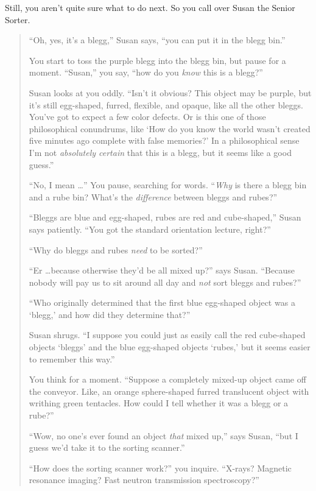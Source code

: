 {
 Still, you aren't quite sure what to do next. So
you call over Susan the Senior Sorter.}

\begin{quotation}
{
 ``Oh, yes, it's a
blegg,'' Susan says, ``you can put
it in the blegg bin.''}

{
 You start to toss the purple blegg into the blegg bin, but pause
for a moment. ``Susan,'' you say,
``how do you \textit{know} this is a
blegg?''}

{
 Susan looks at you oddly. ``Isn't
it obvious? This object may be purple, but it's still
egg-shaped, furred, flexible, and opaque, like all the other bleggs.
You've got to expect a few color defects. Or is this
one of those philosophical conundrums, like `How do you
know the world wasn't created five minutes ago complete
with false memories?' In a philosophical sense
I'm not \textit{absolutely certain} that this is a
blegg, but it seems like a good guess.''}

{
 ``No, I mean \ldots'' You pause,
searching for words. ``\textit{Why} is there a blegg
bin and a rube bin? What's the \textit{difference}
between bleggs and rubes?''}

{
 ``Bleggs are blue and egg-shaped, rubes are red
and cube-shaped,'' Susan says patiently.
``You got the standard orientation lecture,
right?''}

{
 ``Why do bleggs and rubes \textit{need} to be
sorted?''}

{
 ``Er \ldots because otherwise
they'd be all mixed up?'' says Susan.
``Because nobody will pay us to sit around all day and
\textit{not} sort bleggs and rubes?''}

{
 ``Who originally determined that the first blue
egg-shaped object was a `blegg,' and how
did they determine that?''}

{
 Susan shrugs. ``I suppose you could just as
easily call the red cube-shaped objects
`bleggs' and the blue egg-shaped objects
`rubes,' but it seems easier to remember
this way.''}

{
 You think for a moment. ``Suppose a completely
mixed-up object came off the conveyor. Like, an orange sphere-shaped
furred translucent object with writhing green tentacles. How could I
tell whether it was a blegg or a rube?''}

{
 ``Wow, no one's ever found an
object \textit{that} mixed up,'' says Susan,
``but I guess we'd take it to the
sorting scanner.''}

{
 ``How does the sorting scanner
work?'' you inquire. ``X-rays?
Magnetic resonance imaging? Fast neutron transmission
spectroscopy?''}


\end{quotation}
